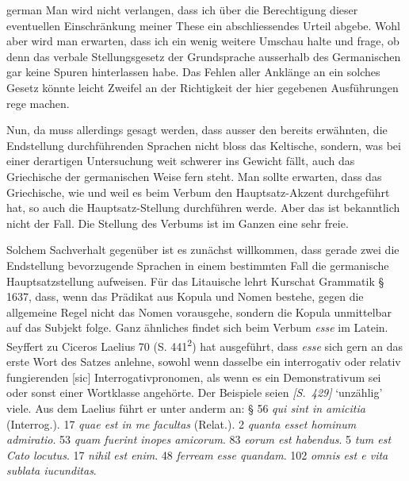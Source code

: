 \begin{otherlanguage*}{german}
Man wird nicht verlangen, dass ich über die Berechtigung dieser eventuellen Einschränkung meiner These ein abschliessendes Urteil abgebe. Wohl aber wird man erwarten, dass ich ein wenig weitere Umschau halte und frage, ob denn das verbale Stellungsgesetz der Grundsprache ausserhalb des Germanischen gar keine Spuren hinterlassen habe. Das Fehlen aller Anklänge an ein solches Gesetz könnte leicht Zweifel an der Richtigkeit der hier gegebenen Ausführungen rege machen.

Nun, da muss allerdings gesagt werden, dass ausser den bereits erwähnten, die Endstellung durchführenden Sprachen nicht bloss das Keltische, sondern, was bei einer derartigen Untersuchung weit schwerer ins Gewicht fällt, auch das Griechische der germanischen Weise fern steht. Man sollte erwarten, dass das Griechische, wie und weil es beim Verbum den Hauptsatz-Akzent durchgeführt hat, so auch die Hauptsatz-Stellung durchführen werde. Aber das ist bekanntlich nicht der Fall. Die Stellung des Verbums ist im Ganzen eine sehr freie.

Solchem Sachverhalt gegenüber ist es zunächst willkommen, dass gerade zwei die Endstellung bevorzugende Sprachen in einem bestimmten Fall die germanische Hauptsatzstellung aufweisen. Für das Litauische lehrt Kurschat Grammatik § 1637, dass, wenn das Prädikat aus Kopula und Nomen bestehe, gegen die allgemeine Regel nicht das Nomen vorausgehe, sondern die Kopula unmittelbar auf das Subjekt folge. Ganz ähnliches findet sich beim Verbum \emph{esse} im Latein. Seyffert zu Ciceros Laelius 70 (S. 441\textsuperscript{2}) hat ausgeführt, dass \emph{esse} sich gern an das erste Wort des Satzes anlehne, sowohl wenn dasselbe ein interrogativ oder relativ fungierenden [sic] Interrogativpronomen, als wenn es ein Demonstrativum sei oder sonst einer Wortklasse angehörte. Der Beispiele seien \hypertarget{p429}{\emph{[S.~429]}}\label{p429} ‘unzählig’ viele. Aus dem Laelius führt er unter anderm an: § 56 \emph{qui sint in amicitia} (Interrog.). 17 \emph{quae est in me facultas} (Relat.). 2 \emph{quanta esset hominum admiratio}. 53 \emph{quam fuerint inopes amicorum}. 83 \emph{eorum est habendus}. 5 \emph{tum est Cato locutus}. 17 \emph{nihil est enim}. 48 \emph{ferream esse quandam}. 102 \emph{omnis est e vita sublata iucunditas}.


\end{otherlanguage*}
